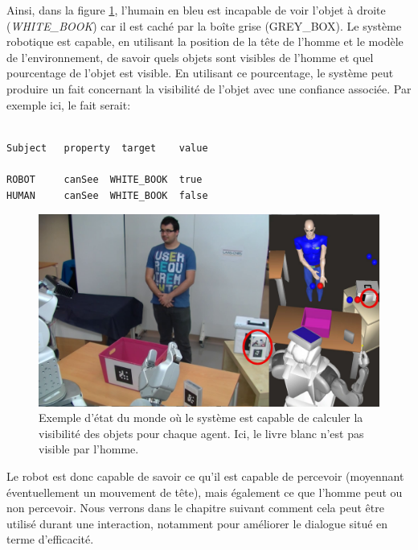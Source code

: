 \documentclass[a4paper,11pt,twoside]{StyleThese}
\begin{document}
Ainsi, dans la figure \ref{fig:occludedHuman}, l'humain en bleu est incapable de voir l'objet à droite (\textit{WHITE\_BOOK}) car il est caché par la boîte grise (GREY\_BOX). Le système robotique est capable, en utilisant la position de la tête de l'homme et le modèle de l'environnement, de savoir quels objets sont visibles de l'homme et quel pourcentage de l'objet est visible.
En utilisant ce pourcentage, le système peut produire un fait concernant la visibilité de l'objet avec une confiance associée. Par exemple ici, le fait serait:

\begin{scriptsize}
\begin{verbatim}

Subject   property  target    value

ROBOT     canSee  WHITE_BOOK  true
HUMAN     canSee  WHITE_BOOK  false
\end{verbatim}
\end{scriptsize}

\begin{figure}[ht!]
 \centering
  \includegraphics[width=0.99\linewidth]{./img/blueMovedPr2M.png} 
  \caption {Exemple d'état du monde où le système est capable de calculer la visibilité des objets pour chaque agent. Ici, le livre blanc n'est pas visible par l'homme.}
  \label{fig:occludedHuman}
\end{figure}


Le robot est donc capable de savoir ce qu'il est capable de percevoir (moyennant éventuellement un mouvement de tête), mais également ce que l'homme peut ou non percevoir. Nous verrons dans le chapitre suivant comment cela peut être utilisé durant une interaction, notamment pour améliorer le dialogue situé en terme d'efficacité.
\end{document}

